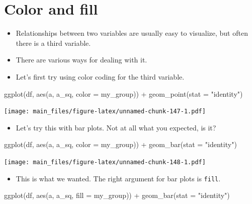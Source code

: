 \documentclass[
]{book}
\newenvironment{Shaded}{\begin{snugshade}}{\end{snugshade}}
\newcommand{\AttributeTok}[1]{\textcolor[rgb]{0.77,0.63,0.00}{#1}}
\newcommand{\FunctionTok}[1]{\textcolor[rgb]{0.00,0.00,0.00}{#1}}
\newcommand{\NormalTok}[1]{#1}
\newcommand{\SpecialCharTok}[1]{\textcolor[rgb]{0.00,0.00,0.00}{#1}}
\newcommand{\StringTok}[1]{\textcolor[rgb]{0.31,0.60,0.02}{#1}}
\providecommand{\tightlist}{%
  \setlength{\itemsep}{0pt}\setlength{\parskip}{0pt}}
\begin{document}
\hypertarget{color-and-fill}{%
\section{Color and fill}\label{color-and-fill}}

\begin{itemize}
\item
  Relationships between two variables are usually easy to visualize, but often there is a third variable.
\item
  There are various ways for dealing with it.
\item
  Let's first try using color coding for the third variable.
\end{itemize}

\begin{Shaded}
\begin{Highlighting}[]
\FunctionTok{ggplot}\NormalTok{(df, }\FunctionTok{aes}\NormalTok{(a, a\_sq, }\AttributeTok{color =}\NormalTok{ my\_group)) }\SpecialCharTok{+} \FunctionTok{geom\_point}\NormalTok{(}\AttributeTok{stat =} \StringTok{"identity"}\NormalTok{)}
\end{Highlighting}
\end{Shaded}

\texttt{[image: main\_files/figure-latex/unnamed-chunk-147-1.pdf]}

\begin{itemize}
\tightlist
\item
  Let's try this with bar plots. Not at all what you expected, is it?
\end{itemize}

\begin{Shaded}
\begin{Highlighting}[]
\FunctionTok{ggplot}\NormalTok{(df, }\FunctionTok{aes}\NormalTok{(a, a\_sq, }\AttributeTok{color =}\NormalTok{ my\_group)) }\SpecialCharTok{+} \FunctionTok{geom\_bar}\NormalTok{(}\AttributeTok{stat =} \StringTok{"identity"}\NormalTok{)}
\end{Highlighting}
\end{Shaded}

\texttt{[image: main\_files/figure-latex/unnamed-chunk-148-1.pdf]}

\begin{itemize}
\tightlist
\item
  This is what we wanted. The right argument for bar plots is \texttt{fill}.
\end{itemize}

\begin{Shaded}
\begin{Highlighting}[]
\FunctionTok{ggplot}\NormalTok{(df, }\FunctionTok{aes}\NormalTok{(a, a\_sq, }\AttributeTok{fill =}\NormalTok{ my\_group)) }\SpecialCharTok{+} \FunctionTok{geom\_bar}\NormalTok{(}\AttributeTok{stat =} \StringTok{"identity"}\NormalTok{)}
\end{Highlighting}
\end{Shaded}
\end{document}
